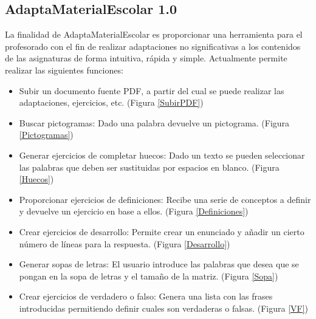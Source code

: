 \subsection{AdaptaMaterialEscolar 1.0}
\label{cap:adaptaMaterial}
La finalidad de AdaptaMaterialEscolar es proporcionar una herramienta para el profesorado con el fin de realizar adaptaciones no significativas a los contenidos de las asignaturas de forma intuitiva, rápida y simple. Actualmente permite realizar las siguientes funciones:
\begin{itemize}
    \item Subir un documento fuente PDF, a partir del cual se puede realizar las adaptaciones, ejercicios, etc. (Figura \ref{SubirPDF})
    \item Buscar pictogramas: Dado una palabra devuelve un pictograma. (Figura \ref{Pictogramas})
    \item Generar ejercicios de completar huecos: Dado un texto se pueden seleccionar las palabras que deben ser sustituidas por espacios en blanco. (Figura \ref{Huecos})
    \item Proporcionar ejercicios de definiciones: Recibe una serie de conceptos a definir y devuelve un ejercicio en base a ellos. (Figura \ref{Definiciones})
    \item Crear ejercicios de desarrollo: Permite crear un enunciado y añadir un cierto número de líneas para la respuesta. (Figura \ref{Desarrollo})
    \item Generar sopas de letras: El usuario introduce las palabras que desea que se pongan en la sopa de letras y el tamaño de la matriz. (Figura \ref{Sopa})
    \item Crear ejercicios de verdadero o falso: Genera una lista con las frases introducidas permitiendo definir cuales son verdaderas o falsas. (Figura \ref{VF})
\end{itemize}

